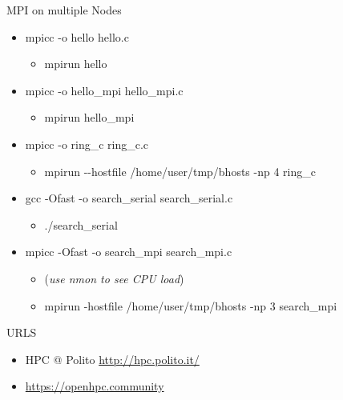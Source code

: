 \documentclass[ignorenonframetext,]{beamer}
\providecommand{\tightlist}{%
  \setlength{\itemsep}{0pt}\setlength{\parskip}{0pt}}
\begin{document}
\begin{frame}{MPI on multiple Nodes}

\begin{itemize}
\tightlist
\item
  mpicc -o hello hello.c

  \begin{itemize}
  \tightlist
  \item
    mpirun hello
  \end{itemize}

\item
  mpicc -o hello\_mpi hello\_mpi.c

  \begin{itemize}
  \tightlist
  \item
    mpirun hello\_mpi
  \end{itemize}

\item
  mpicc -o ring\_c ring\_c.c

  \begin{itemize}
  \tightlist
  \item
    mpirun -\/-hostfile /home/user/tmp/bhosts -np 4 ring\_c
  \end{itemize}

\item
  gcc -Ofast -o search\_serial search\_serial.c

  \begin{itemize}
  \tightlist
  \item
    ./search\_serial
  \end{itemize}

\item
  mpicc -Ofast -o search\_mpi search\_mpi.c

  \begin{itemize}
  \tightlist
  \item
    (\emph{use nmon to see CPU load})
  \item
    mpirun -hostfile /home/user/tmp/bhosts -np 3 search\_mpi
  \end{itemize}

\end{itemize}


\end{frame}

\begin{frame}{URLS}

\begin{itemize}
\tightlist
\item
  HPC @ Polito \url{http://hpc.polito.it/}
\end{itemize}


\begin{itemize}
\tightlist
\item
  \url{https://openhpc.community}
\end{itemize}

\end{frame}
\end{document}
